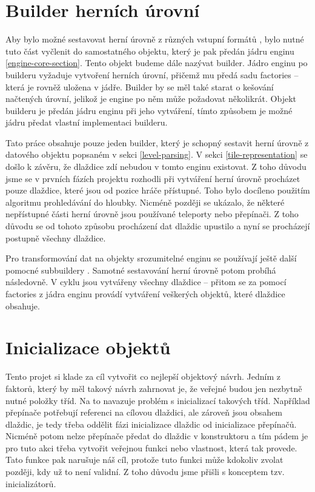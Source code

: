 \section{Builder herních úrovní}

Aby bylo možné sestavovat herní úrovně z různých vstupní formátů , bylo nutné tuto část vyčlenit do samostatného
objektu, který je pak předán jádru enginu \vref{engine-core-section}. Tento objekt budeme dále nazývat builder. Jádro enginu
po builderu vyžaduje vytvoření herních úrovní, přičemž mu předá sadu factories -- která je rovněž uložena v jádře. Builder
by se měl také starat o kešování načtených úrovní, jelikož je engine po něm může požadovat několikrát. Objekt builderu
je předán jádru enginu při jeho vytváření, tímto způsobem je možné jádru předat vlastní implementaci builderu.

Tato práce obsahuje pouze jeden builder, který je schopný sestavit herní úrovně z datového objektu popsaném v sekci \ref{level-parsing}.
V sekci \ref{tile-representation} se došlo k závěru, že dlaždice zdí nebudou v tomto enginu existovat. Z toho důvodu jsme se 
v prvních fázích projektu rozhodli při vytváření herní úrovně procházet pouze dlaždice, které jsou od pozice hráče přístupné.
Toho bylo docíleno použitím algoritmu prohledávání do hloubky. Nicméně později se ukázalo, že některé nepřístupné části herní úrovně
jsou používané teleporty nebo přepínači. Z toho důvodu se od tohoto způsobu procházení dat dlaždic upustilo a nyní se procházejí 
postupně všechny dlaždice.

Pro transformování dat na objekty srozumitelné enginu se používají ještě další pomocné subbuildery . 
Samotné sestavování herní úrovně potom probíhá následovně. V cyklu jsou vytvářeny všechny dlaždice -- přitom se za pomocí factories 
z jádra enginu provádí vytváření veškerých objektů, které dlaždice obsahuje.


\section{Inicializace objektů}\label{level-inicialization}

Tento projet si klade za cíl  vytvořit co nejlepší objektový návrh. Jedním z faktorů, který by měl takový návrh
zahrnovat je, že veřejné budou jen nezbytně nutné položky tříd. Na to navazuje problém s inicializací takových tříd. 
Například přepínače potřebují referenci na cílovou dlaždici, ale zároveň jsou obsahem dlaždic, je tedy třeba oddělit fázi inicializace 
dlaždic od inicializace přepínačů. Nicméně potom nelze přepínače předat do dlaždic v konstruktoru a tím pádem je pro tuto akci třeba 
vytvořit veřejnou funkci nebo vlastnost, která tak provede. Tato funkce pak narušuje náš cíl, protože tuto funkci může kdokoliv
zvolat později, kdy už to není validní. Z toho důvodu jsme přišli s konceptem tzv. inicializátorů.

